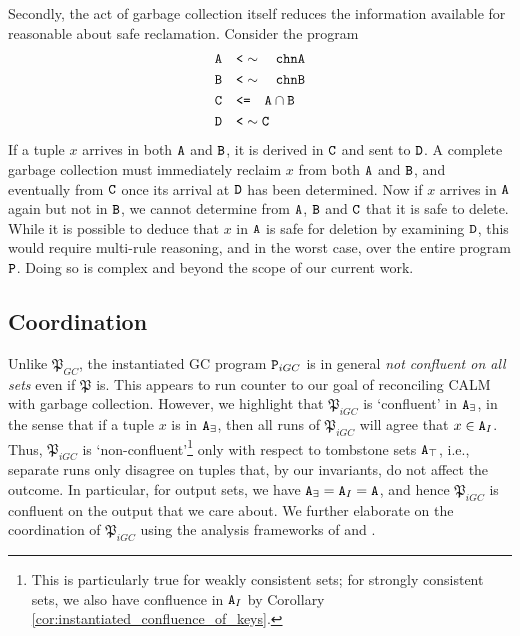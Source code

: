 Secondly, the act of garbage collection itself reduces the information available for reasonable about safe reclamation.
Consider the program
\begin{align*}
\tt{A} &\quad\tt{<}\sim\quad \tt{chnA}\\
\tt{B} &\quad\tt{<}\sim\quad \tt{chnB}\\
\tt{C} &\quad\tt{<=}\quad \tt{A} \cap \tt{B}\\
\tt{D} &\quad\tt{<}\sim \tt{C}
\end{align*}
If a tuple $x$ arrives in both $\tt{A}$ and $\tt{B}$, it is derived in $\tt{C}$ and sent to $\tt{D}$.
A complete garbage collection must immediately reclaim $x$ from both $\tt{A}$ and $\tt{B}$, and eventually from $\tt{C}$ once its arrival at $\tt{D}$ has been determined.
Now if $x$ arrives in $\tt{A}$ again but not in $\tt{B}$, we cannot determine from $\tt{A}$, $\tt{B}$ and $\tt{C}$ that it is safe to delete.
While it is possible to deduce that $x$ in $\tt{A}$ is safe for deletion by examining $\tt{D}$, this would require multi-rule reasoning, and in the worst case, over the entire program $\tt{P}$.
Doing so is complex and beyond the scope of our current work.



\subsection{Coordination}
Unlike $\mathfrak{P}_{GC}$, the instantiated GC program $\tt{P}_{iGC}$ is in general \emph{not confluent on all sets} even if $\mathfrak{P}$ is.
This appears to run counter to our goal of reconciling CALM with garbage collection.
However, we highlight that $\mathfrak{P}_{iGC}$ is `confluent' in $\tt{A}_\exists$, in the sense that if a tuple $x$ is in $\tt{A}_\exists$, then all runs of $\mathfrak{P}_{iGC}$ will agree that $x \in \tt{A}_I$.
Thus, $\mathfrak{P}_{iGC}$ is `non-confluent'\footnote{
	This is particularly true for weakly consistent sets; for strongly consistent sets, we also have confluence in $\tt{A}_I$ by Corollary \ref{cor:instantiated_confluence_of_keys}.
}
only with respect to tombstone sets $\tt{A}_\top$, i.e., separate runs only disagree on tuples that, by our invariants, do not affect the outcome.
In particular, for output sets, we have $\tt{A}_\exists = \tt{A}_I = \tt{A}$, and hence $\mathfrak{P}_{iGC}$ is confluent on the output that we care about.
We further elaborate on the coordination of $\mathfrak{P}_{iGC}$ using the analysis frameworks of \cite{marczak2012confluence} and \cite{ameloot2013relational}.


